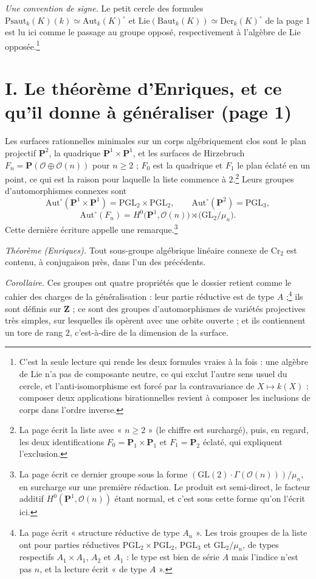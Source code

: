 \documentclass[11pt,a4paper]{article}
\begin{document}
\emph{Une convention de signe.} Le petit cercle des formules
$\mathrm{Psaut}_k(K)(k) \simeq \mathrm{Aut}_k(K)^\circ$ et
$\mathrm{Lie}(\mathrm{Baut}_k(K)) \simeq \mathrm{Der}_k(K)^\circ$ de la page 1
est lu ici comme le passage au groupe opposé, respectivement à l'algèbre de Lie
opposée.\footnote{C'est la seule lecture qui rende les deux formules vraies à
la fois : une algèbre de Lie n'a pas de composante neutre, ce qui exclut
l'autre sens usuel du cercle, et l'anti-isomorphisme est forcé par la
contravariance de $X \mapsto k(X)$ : composer deux applications birationnelles
revient à composer les inclusions de corps dans l'ordre inverse.}

\section*{I. Le théorème d'Enriques, et ce qu'il donne à généraliser (page 1)}

Les surfaces rationnelles minimales sur un corps algébriquement clos sont le
plan projectif $\mathbf{P}^2$, la quadrique $\mathbf{P}^1 \times \mathbf{P}^1$,
et les surfaces de Hirzebruch $F_n = \mathbf{P}(\mathcal{O} \oplus
\mathcal{O}(n))$ pour $n \geq 2$ ; $F_0$ est la quadrique et $F_1$ le plan
éclaté en un point, ce qui est la raison pour laquelle la liste commence à
$2$.\footnote{La page écrit la liste avec « $n \geq 2$ » (le chiffre est
surchargé), puis, en regard, les deux identifications $F_0 = \mathbf{P}_1
\times \mathbf{P}_1$ et $F_1 = \mathbf{P}_2$ éclaté, qui expliquent
l'exclusion.} Leurs groupes d'automorphismes connexes sont
\[
  \mathrm{Aut}^\circ(\mathbf{P}^1 \times \mathbf{P}^1) = \mathrm{PGL}_2 \times
    \mathrm{PGL}_2, \qquad
  \mathrm{Aut}^\circ(\mathbf{P}^2) = \mathrm{PGL}_3,
\]
\[
  \mathrm{Aut}^\circ(F_n) = H^0\bigl(\mathbf{P}^1, \mathcal{O}(n)\bigr)
    \rtimes \bigl(\mathrm{GL}_2/\mu_n\bigr).
\]
Cette dernière écriture appelle une remarque.\footnote{La page écrit ce dernier groupe sous la forme
$(\mathrm{GL}(2)\cdot\Gamma(\mathcal{O}(n)))/\mu_n$, en surcharge sur une
première rédaction. Le produit est semi-direct, le facteur additif
$H^0(\mathbf{P}^1, \mathcal{O}(n))$ étant normal, et c'est sous cette forme
qu'on l'écrit ici.}

\emph{Théorème (Enriques).} Tout sous-groupe algébrique linéaire connexe de
$\mathrm{Cr}_2$ est contenu, à conjugaison près, dans l'un des précédents.

\emph{Corollaire.} Ces groupes ont quatre propriétés que le dossier retient
comme le cahier des charges de la généralisation : leur partie réductive est de
type $A$ ;\footnote{La page écrit « structure réductive de type $A_n$ ». Les
trois groupes de la liste ont pour parties réductives $\mathrm{PGL}_2 \times
\mathrm{PGL}_2$, $\mathrm{PGL}_3$ et $\mathrm{GL}_2/\mu_n$, de types
respectifs $A_1 \times A_1$, $A_2$ et $A_1$ : le type est bien de série $A$
mais l'indice n'est pas $n$, et la lecture écrit « de type $A$ ».} ils sont
définis sur $\mathbf{Z}$ ; ce sont des groupes d'automorphismes de variétés
projectives très simples, sur lesquelles ils opèrent avec une orbite ouverte ;
et ils contiennent un tore de rang $2$, c'est-à-dire de la dimension de la
surface.
\end{document}
